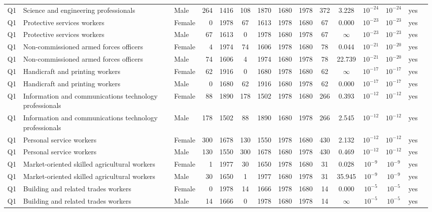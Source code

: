 \begin{longtable}{lllrcccccccccll}
Q1 & Science and engineering professionals & Male & 264 & 1416 & 108 & 1870 & 1680 & 1978 & 372 & 3.228 & $10^{-24}$ & $10^{-24}$ & yes \\
Q1 & Protective services workers & Female & 0 & 1978 & 67 & 1613 & 1978 & 1680 & 67 & 0.000 & $10^{-23}$ & $10^{-23}$ & yes \\
Q1 & Protective services workers & Male & 67 & 1613 & 0 & 1978 & 1680 & 1978 & 67 & $\infty$ & $10^{-23}$ & $10^{-23}$ & yes \\
Q1 & Non-commissioned armed forces officers & Female & 4 & 1974 & 74 & 1606 & 1978 & 1680 & 78 & 0.044 & $10^{-21}$ & $10^{-20}$ & yes \\
Q1 & Non-commissioned armed forces officers & Male & 74 & 1606 & 4 & 1974 & 1680 & 1978 & 78 & 22.739 & $10^{-21}$ & $10^{-20}$ & yes \\
Q1 & Handicraft and printing workers & Female & 62 & 1916 & 0 & 1680 & 1978 & 1680 & 62 & $\infty$ & $10^{-17}$ & $10^{-17}$ & yes \\
Q1 & Handicraft and printing workers & Male & 0 & 1680 & 62 & 1916 & 1680 & 1978 & 62 & 0.000 & $10^{-17}$ & $10^{-17}$ & yes \\
Q1 & Information and communications technology professionals & Female & 88 & 1890 & 178 & 1502 & 1978 & 1680 & 266 & 0.393 & $10^{-12}$ & $10^{-12}$ & yes \\
Q1 & Information and communications technology professionals & Male & 178 & 1502 & 88 & 1890 & 1680 & 1978 & 266 & 2.545 & $10^{-12}$ & $10^{-12}$ & yes \\
Q1 & Personal service workers & Female & 300 & 1678 & 130 & 1550 & 1978 & 1680 & 430 & 2.132 & $10^{-12}$ & $10^{-12}$ & yes \\
Q1 & Personal service workers & Male & 130 & 1550 & 300 & 1678 & 1680 & 1978 & 430 & 0.469 & $10^{-12}$ & $10^{-12}$ & yes \\
Q1 & Market-oriented skilled agricultural workers & Female & 1 & 1977 & 30 & 1650 & 1978 & 1680 & 31 & 0.028 & $10^{-9}$ & $10^{-9}$ & yes \\
Q1 & Market-oriented skilled agricultural workers & Male & 30 & 1650 & 1 & 1977 & 1680 & 1978 & 31 & 35.945 & $10^{-9}$ & $10^{-9}$ & yes \\
Q1 & Building and related trades workers & Female & 0 & 1978 & 14 & 1666 & 1978 & 1680 & 14 & 0.000 & $10^{-5}$ & $10^{-5}$ & yes \\
Q1 & Building and related trades workers & Male & 14 & 1666 & 0 & 1978 & 1680 & 1978 & 14 & $\infty$ & $10^{-5}$ & $10^{-5}$ & yes \\

\end{longtable}
